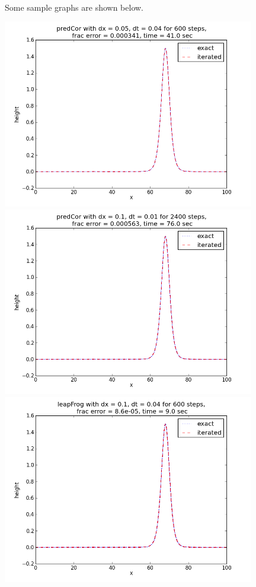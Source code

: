 \documentclass[a4paper,12pt]{article}
\begin{document}
	\paragraph*{}
		Some sample graphs are shown below.
	\begin{center}
		\includegraphics[width=11cm]{output2}
		\includegraphics[width=11cm]{output5}
		\includegraphics[width=11cm]{output9}
	\end{center}
\end{document}
